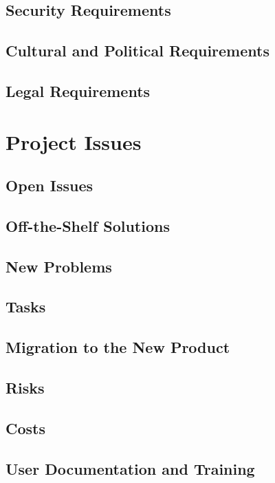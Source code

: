 \documentclass{scrreprt}
\begin{document}
\section{Security Requirements}

\section{Cultural and Political Requirements}

\section{Legal Requirements}

\chapter{Project Issues}

\section{Open Issues}

\section{Off-the-Shelf Solutions}

\section{New Problems}

\section{Tasks}

\section{Migration to the New Product}

\section{Risks}

\section{Costs}

\section{User Documentation and Training}
\end{document}
